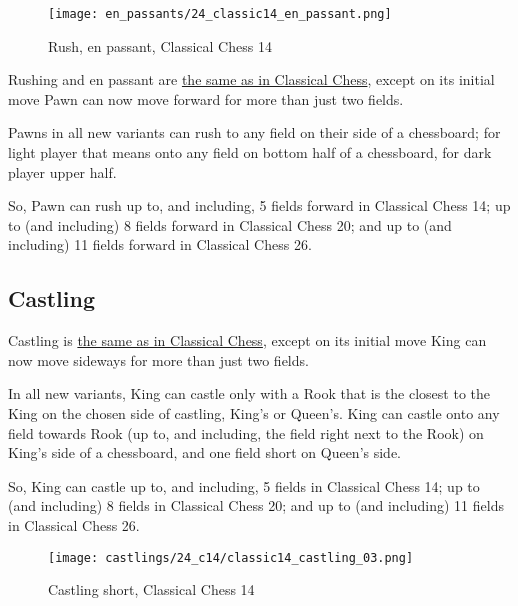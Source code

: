 \noindent
\begin{wrapfigure}{l}{0.4\textwidth}
\centering
\texttt{[image: en\_passants/24\_classic14\_en\_passant.png]}
\caption{Rush, en passant, Classical Chess 14}
\label{fig:24_classic14_en_passant}
\end{wrapfigure}
Rushing and en passant are
\href{https://en.wikipedia.org/wiki/En\_passant}{the same as in Classical Chess},
except on its initial move Pawn can now move forward for more than just two
fields.

Pawns in all new variants can rush to any field on their side of a chessboard;
for light player that means onto any field on bottom half of a chessboard, for
dark player upper half.

So, Pawn can rush up to, and including, 5 fields forward in Classical Chess 14;
up to (and including) 8 fields forward in Classical Chess 20; and up to (and
including) 11 fields forward in Classical Chess 26.

\vfill{}

\clearpage %

\subsection*{Castling}
\label{sec:Simple variants/Classical Chess variants/Castling}

Castling is
\href{https://en.wikipedia.org/wiki/Castling}{the same as in Classical Chess},
except on its initial move King can now move sideways for more than just two
fields.

In all new variants, King can castle only with a Rook that is the closest to the
King on the chosen side of castling, King's or Queen's. King can castle onto any
field towards Rook (up to, and including, the field right next to the Rook) on
King's side of a chessboard, and one field short on Queen's side.

So, King can castle up to, and including, 5 fields in Classical Chess 14;
up to (and including) 8 fields in Classical Chess 20; and up to (and
including) 11 fields in Classical Chess 26.

\noindent
\begin{figure}[!h]
\texttt{[image: castlings/24\_c14/classic14\_castling\_03.png]}
\vspace*{-1.4\baselineskip}
\caption{Castling short, Classical Chess 14}
\label{fig:classic14_castling_03}
\end{figure}

